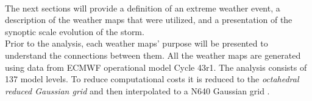 \\
The next sections will provide a definition of an extreme weather event, a description of the weather maps that were utilized, and a presentation of the synoptic scale evolution of the storm. \\
Prior to the analysis, each weather maps' purpose  will be presented to understand the connections between them. All the weather maps are generated using data from ECMWF operational model Cycle {43r1}. The analysis consists of 137 model levels. To reduce computational costs it is reduced to the \textit{octahedral reduced Gaussian grid} and then interpolated to a N640 Gaussian grid \citep{dando_introducing_2016}. 



% 




\newpage








